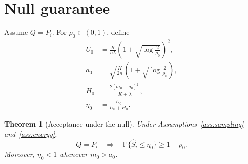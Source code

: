 \documentclass[11pt]{article}
\newcommand{\Prob}{\mathbb P}
\newtheorem{theorem}{Theorem}
\begin{document}
\section{Null guarantee}

Assume $Q=P_i$. For $\rho_0\in(0,1)$, define
\begin{align}
U_0
&=\frac K{n\lambda}
\left(1+\sqrt{\log\frac2{\rho_0}}\right)^2,
\\
a_0
&=\sqrt{\frac K{2n}}
\left(1+\sqrt{\log\frac2{\rho_0}}\right),
\\
H_0
&=\frac{2[m_0-a_0]_+^2}{K+\lambda},
\\
\eta_0
&=\frac{U_0}{U_0+H_0}.
\label{eq:eta0}
\end{align}

\begin{theorem}[Acceptance under the null]
\label{thm:null}
Under Assumptions~\ref{ass:sampling} and~\ref{ass:energy},
\[
Q=P_i
\quad\Longrightarrow\quad
\Prob\{\widehat S_i\le\eta_0\}\ge1-\rho_0.
\]
Moreover, $\eta_0<1$ whenever $m_0>a_0$.
\end{theorem}
\end{document}
